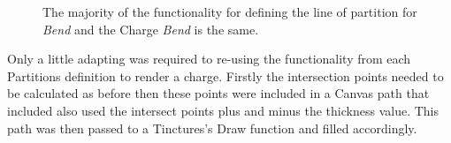\begin{figure}[H]
\hfill
{}
\hfill
\caption{The majority of the functionality for defining the line of partition for \emph{Bend} and the Charge \emph{Bend} is the same.}
\label{fig:charge}
\end{figure}


Only a little adapting was required to re-using the functionality from each Partitions definition to render a charge.  Firstly the intersection points needed to be calculated as before then these points were included in a Canvas path that included also used the intersect points plus and minus the thickness value.  This path was then passed to a Tinctures's Draw function and filled accordingly. 


